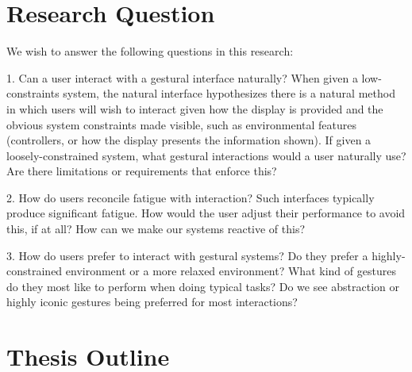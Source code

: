 \section{Research Question}
\label{sec:researchquestion}


\begin{todoenv}
We wish to answer the following questions in this research:

1. Can a user interact with a gestural interface naturally? When given a low-constraints system, the natural interface hypothesizes there is a natural method in which users will wish to interact given how the display is provided and the obvious system constraints made visible, such as environmental features (controllers, or how the display presents the information shown). If given a loosely-constrained system, what gestural interactions would a user naturally use? Are there limitations or requirements that enforce this?

2. How do users reconcile fatigue with interaction? Such interfaces typically produce significant fatigue. How would the user adjust their performance to avoid this, if at all? How can we make our systems reactive of this?

3. How do users prefer to interact with gestural systems? Do they prefer a highly-constrained environment or a more relaxed environment? What kind of gestures do they most like to perform when doing typical tasks? Do we see abstraction or highly iconic gestures being preferred for most interactions?

\end{todoenv}

\section{Thesis Outline}
\label{sec:outline}


